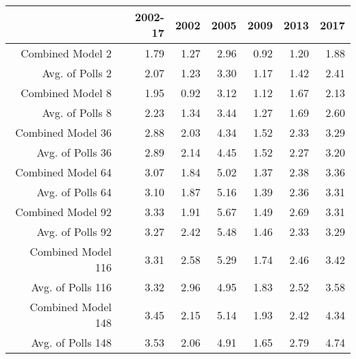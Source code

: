 \begin{table}[ht]
\centering
\begin{tabular}{rrrrrrr}
  \hline
 & 2002-17 & 2002 & 2005 & 2009 & 2013 & 2017 \\ 
  \hline
Combined Model 2 & 1.79 & 1.27 & 2.96 & 0.92 & 1.20 & 1.88 \\ 
  Avg. of Polls 2 & 2.07 & 1.23 & 3.30 & 1.17 & 1.42 & 2.41 \\ 
  Combined Model 8 & 1.95 & 0.92 & 3.12 & 1.12 & 1.67 & 2.13 \\ 
  Avg. of Polls 8 & 2.23 & 1.34 & 3.44 & 1.27 & 1.69 & 2.60 \\ 
  Combined Model 36 & 2.88 & 2.03 & 4.34 & 1.52 & 2.33 & 3.29 \\ 
  Avg. of Polls 36 & 2.89 & 2.14 & 4.45 & 1.52 & 2.27 & 3.20 \\ 
  Combined Model 64 & 3.07 & 1.84 & 5.02 & 1.37 & 2.38 & 3.36 \\ 
  Avg. of Polls 64 & 3.10 & 1.87 & 5.16 & 1.39 & 2.36 & 3.31 \\ 
  Combined Model 92 & 3.33 & 1.91 & 5.67 & 1.49 & 2.69 & 3.31 \\ 
  Avg. of Polls 92 & 3.27 & 2.42 & 5.48 & 1.46 & 2.33 & 3.29 \\ 
  Combined Model 116 & 3.31 & 2.58 & 5.29 & 1.74 & 2.46 & 3.42 \\ 
  Avg. of Polls 116 & 3.32 & 2.96 & 4.95 & 1.83 & 2.52 & 3.58 \\ 
  Combined Model 148 & 3.45 & 2.15 & 5.14 & 1.93 & 2.42 & 4.34 \\ 
  Avg. of Polls 148 & 3.53 & 2.06 & 4.91 & 1.65 & 2.79 & 4.74 \\ 
   \hline
\end{tabular}
\end{table}
